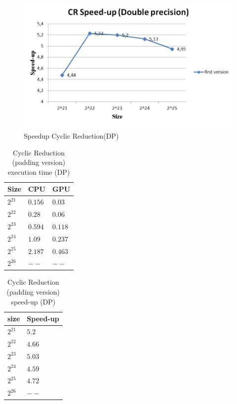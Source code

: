 \begin{figure}[H]
   \centering
       \includegraphics[width=1\textwidth]{grafhmata/cr_first_dp_speedup.png}
   \caption{Speedup Cyclic Reduction(DP)}
   \label{fig:Speedup Cyclic Reduction(DP)}
\end{figure}

\begin{table}[H]
\caption{Cyclic Reduction (padding version) execution time (DP)} 
\centering 
\begin{tabular}{| l | p{3cm} | p{3cm} |} 
\hline\hline 
Size & CPU & GPU  \\ [0.8ex] 
\hline 
        $2^{21}$ & $0.156$& $0.03$ \\ 	
        $2^{22}$ & $0.28$& $0.06$  \\ 	
        $2^{23}$ & $0.594$& $0.118$ \\ 
        $2^{24}$ & $1.09$& $0.237$ \\ 
        $2^{25}$ & $2.187$& $0.463$  \\ 
        $2^{26}$ & $--$& $--$      \\ [1ex]
\hline 
\end{tabular}
\label{table:cr_padding_double} 
\end{table}

\begin{table}[H]
\caption{Cyclic Reduction (padding version) speed-up (DP)} 
\centering 
\begin{tabular}{| l | p{3cm} |} 
\hline\hline 
size	 & Speed-up  \\  [0.8ex] 
\hline        
        $2^{21}$ & $5.2$      \\	
        $2^{22}$ & $4.66$     \\
        $2^{23}$ & $5.03$      \\ 
        $2^{24}$ & $4.59$    \\ 
        $2^{25}$ & $4.72$     \\ 
        $2^{26}$ & $--$       \\ [1ex]
        \hline
\end{tabular}
\label{table:cr_padding_double_spup} 
\end{table}


